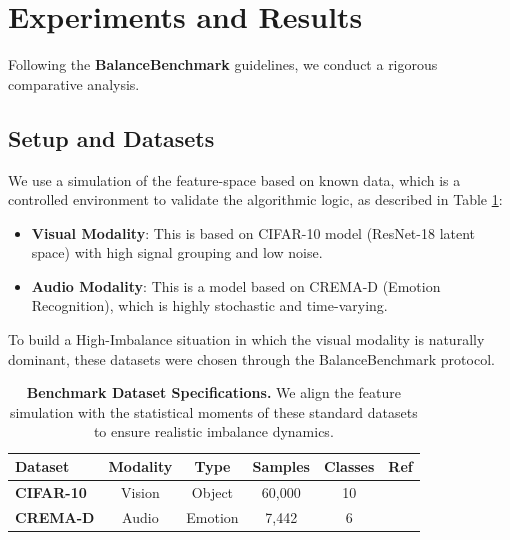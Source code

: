 \documentclass[fleqn,10pt]{wlscirep}
\begin{document}
\section{Experiments and Results}

Following the \textbf{BalanceBenchmark} guidelines, we conduct a rigorous comparative analysis.

\subsection{Setup and Datasets}
We use a simulation of the feature-space based on known data, which is a controlled environment to validate the algorithmic logic, as described in Table \ref{tab:datasets}:
\begin{itemize}
    \item \textbf{Visual Modality}: This is based on CIFAR-10 \cite{krizhevsky2009learning} model (ResNet-18 latent space) with high signal grouping and low noise.
    \item \textbf{Audio Modality}: This is a model based on CREMA-D \cite{cao2014crema} (Emotion Recognition), which is highly stochastic and time-varying.
\end{itemize}
To build a High-Imbalance situation in which the visual modality is naturally dominant, these datasets were chosen through the BalanceBenchmark \cite{xu2025balancebenchmark} protocol.

\begin{table}[h]
\caption{\textbf{Benchmark Dataset Specifications.} We align the feature simulation with the statistical moments of these standard datasets to ensure realistic imbalance dynamics.}
\label{tab:datasets}
\centering
\begin{tabular}{@{}lccccc@{}}
\toprule
\textbf{Dataset} & \textbf{Modality} & \textbf{Type} & \textbf{Samples} & \textbf{Classes} & \textbf{Ref} \\ \midrule
\textbf{CIFAR-10} & Vision & Object & 60,000 & 10 & \cite{krizhevsky2009learning} \\
\textbf{CREMA-D} & Audio & Emotion & 7,442 & 6 & \cite{cao2014crema} \\ \bottomrule
\end{tabular}
\end{table}
\end{document}
